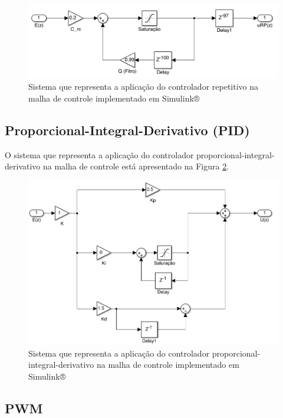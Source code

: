 	 \begin{figure}[hbt]
		\centering
  		\includegraphics[scale=.4]{Imagens/Relatorio6/Repetitivo}
  		\caption{Sistema que representa a aplicação do controlador repetitivo na malha de controle implementado em Simulink®}
  		\label{CRP}
		\end{figure}
	 
	 \subsection{Proporcional-Integral-Derivativo (PID)}
	 
	 O sistema que representa a aplicação do controlador proporcional-integral-derivativo na malha de controle está apresentado na Figura \ref{PID_6}.
	 
	 \begin{figure}[hbt]
		\centering
  		\includegraphics[scale=.45]{Imagens/Relatorio6/PID}
  		\caption{Sistema que representa a aplicação do controlador proporcional-integral-derivativo na malha de controle implementado em Simulink®}
  		\label{PID_6}
		\end{figure}
	 
	 \subsection{PWM}
	 
